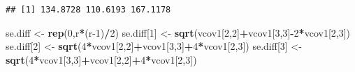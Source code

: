 \documentclass[
]{book}
\newenvironment{Shaded}{\begin{snugshade}}{\end{snugshade}}
\newcommand{\DecValTok}[1]{\textcolor[rgb]{0.00,0.00,0.81}{#1}}
\newcommand{\FunctionTok}[1]{\textcolor[rgb]{0.13,0.29,0.53}{\textbf{#1}}}
\newcommand{\NormalTok}[1]{#1}
\newcommand{\OtherTok}[1]{\textcolor[rgb]{0.56,0.35,0.01}{#1}}
\newcommand{\SpecialCharTok}[1]{\textcolor[rgb]{0.81,0.36,0.00}{\textbf{#1}}}
\begin{document}
\begin{verbatim}
## [1] 134.8728 110.6193 167.1178
\end{verbatim}

\begin{Shaded}
\begin{Highlighting}[]
\NormalTok{se.diff }\OtherTok{\textless{}{-}} \FunctionTok{rep}\NormalTok{(}\DecValTok{0}\NormalTok{,r}\SpecialCharTok{*}\NormalTok{(r}\DecValTok{{-}1}\NormalTok{)}\SpecialCharTok{/}\DecValTok{2}\NormalTok{)}
\NormalTok{se.diff[}\DecValTok{1}\NormalTok{] }\OtherTok{\textless{}{-}} \FunctionTok{sqrt}\NormalTok{(vcov1[}\DecValTok{2}\NormalTok{,}\DecValTok{2}\NormalTok{]}\SpecialCharTok{+}\NormalTok{vcov1[}\DecValTok{3}\NormalTok{,}\DecValTok{3}\NormalTok{]}\SpecialCharTok{{-}}\DecValTok{2}\SpecialCharTok{*}\NormalTok{vcov1[}\DecValTok{2}\NormalTok{,}\DecValTok{3}\NormalTok{])}
\NormalTok{se.diff[}\DecValTok{2}\NormalTok{] }\OtherTok{\textless{}{-}} \FunctionTok{sqrt}\NormalTok{(}\DecValTok{4}\SpecialCharTok{*}\NormalTok{vcov1[}\DecValTok{2}\NormalTok{,}\DecValTok{2}\NormalTok{]}\SpecialCharTok{+}\NormalTok{vcov1[}\DecValTok{3}\NormalTok{,}\DecValTok{3}\NormalTok{]}\SpecialCharTok{+}\DecValTok{4}\SpecialCharTok{*}\NormalTok{vcov1[}\DecValTok{2}\NormalTok{,}\DecValTok{3}\NormalTok{])}
\NormalTok{se.diff[}\DecValTok{3}\NormalTok{] }\OtherTok{\textless{}{-}} \FunctionTok{sqrt}\NormalTok{(}\DecValTok{4}\SpecialCharTok{*}\NormalTok{vcov1[}\DecValTok{3}\NormalTok{,}\DecValTok{3}\NormalTok{]}\SpecialCharTok{+}\NormalTok{vcov1[}\DecValTok{2}\NormalTok{,}\DecValTok{2}\NormalTok{]}\SpecialCharTok{+}\DecValTok{4}\SpecialCharTok{*}\NormalTok{vcov1[}\DecValTok{2}\NormalTok{,}\DecValTok{3}\NormalTok{])}


\end{Highlighting}
\end{Shaded}
\end{document}
